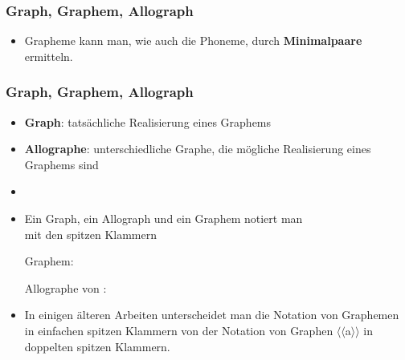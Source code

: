 \begin{frame}
\frametitle{Graph, Graphem, Allograph}

\begin{itemize}
	\item Grapheme kann man, wie auch die Phoneme, durch \textbf{Minimalpaare} ermitteln.
	
	\pause
	 
\settowidth{} 

	\ea {} \vs {} 
	
	\ex {} \vs {} 
	
	\ex {} \vs {} 
	
	\ex {} \vs {} 
	\z
\end{itemize}

\end{frame}


\begin{frame}
\frametitle{Graph, Graphem, Allograph}

	\begin{itemize}
		\item \textbf{Graph}: tatsächliche Realisierung eines Graphems
		\item \textbf{Allographe}: unterschiedliche Graphe, die mögliche Realisierung eines Graphems sind
		\item[]
		\item Ein Graph, ein Allograph und ein Graphem notiert man\\
		mit den spitzen Klammern \ab{}
	
		\ea Graphem: 

		\ex	Allographe von :     %
		\z 
		
		\item In einigen älteren Arbeiten unterscheidet man die Notation von Graphemen  in einfachen spitzen Klammern von der Notation von Graphen $\langle \langle$a$\rangle \rangle$ in doppelten spitzen Klammern.
	\end{itemize}


\end{frame}



